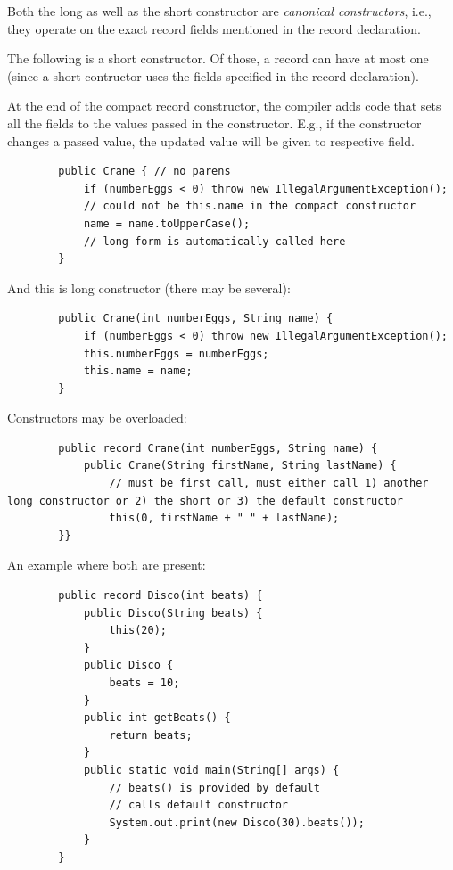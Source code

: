\documentclass{scrartcl}
\begin{document}
Both the long as well as the short constructor are \textit{canonical constructors}, i.e., they operate on the exact record fields mentioned in the record declaration.

The following is a short constructor. Of those, a record can have at most one (since a short contructor uses the fields specified in the record declaration).

At the end of the compact record constructor, the compiler adds code that sets all the fields to the values passed in the constructor. E.g., if the constructor changes a passed value, the updated value will be given to respective field.

    \begin{lstlisting}
        public Crane { // no parens
            if (numberEggs < 0) throw new IllegalArgumentException();
            // could not be this.name in the compact constructor
            name = name.toUpperCase();
            // long form is automatically called here
        }
    \end{lstlisting}

And this is long constructor (there may be several):

    \begin{lstlisting}
        public Crane(int numberEggs, String name) {
            if (numberEggs < 0) throw new IllegalArgumentException();
            this.numberEggs = numberEggs;
            this.name = name;
        }
    \end{lstlisting}

Constructors may be overloaded:

    \begin{lstlisting}
        public record Crane(int numberEggs, String name) {
            public Crane(String firstName, String lastName) {
                // must be first call, must either call 1) another long constructor or 2) the short or 3) the default constructor
                this(0, firstName + " " + lastName);
        }}
    \end{lstlisting}

    An example where both are present:

    \begin{lstlisting}
        public record Disco(int beats) {
            public Disco(String beats) {
                this(20);
            }
            public Disco {
                beats = 10;
            }
            public int getBeats() {
                return beats;
            }
            public static void main(String[] args) {
                // beats() is provided by default
                // calls default constructor
                System.out.print(new Disco(30).beats());
            }
        }
    \end{lstlisting}
\end{document}
